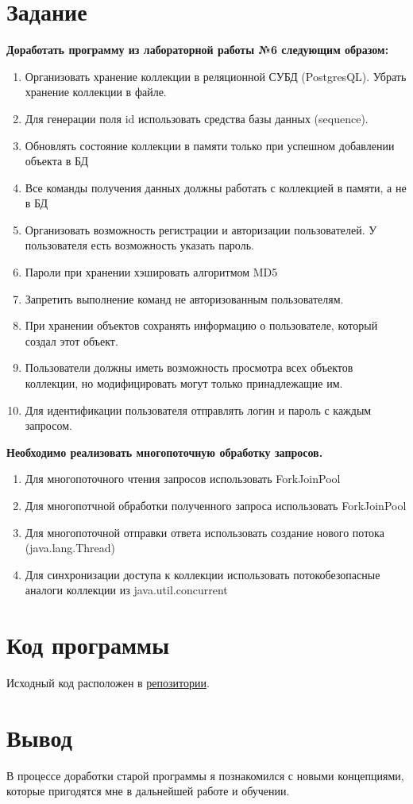 \documentclass[12pt,a4paper]{report}
\begin{document}
\section*{Задание}

\textbf{Доработать программу из лабораторной работы №6 следующим образом:}

\begin{enumerate}
    \item Организовать хранение коллекции в реляционной СУБД (PostgresQL). Убрать хранение коллекции в файле.
    \item Для генерации поля id использовать средства базы данных (sequence).
    \item Обновлять состояние коллекции в памяти только при успешном добавлении объекта в БД
    \item Все команды получения данных должны работать с коллекцией в памяти, а не в БД
    \item Организовать возможность регистрации и авторизации пользователей. У пользователя есть возможность указать пароль.
    \item Пароли при хранении хэшировать алгоритмом MD5
    \item Запретить выполнение команд не авторизованным пользователям.
    \item При хранении объектов сохранять информацию о пользователе, который создал этот объект.
    \item Пользователи должны иметь возможность просмотра всех объектов коллекции, но модифицировать могут только принадлежащие им.
    \item Для идентификации пользователя отправлять логин и пароль с каждым запросом.
\end{enumerate}
\textbf{Необходимо реализовать многопоточную обработку запросов.}
\begin{enumerate}
    \item Для многопоточного чтения запросов использовать ForkJoinPool
    \item Для многопотчной обработки полученного запроса использовать ForkJoinPool
    \item Для многопоточной отправки ответа использовать создание нового потока (java.lang.Thread)
    \item Для синхронизации доступа к коллекции использовать потокобезопасные аналоги коллекции из java.util.concurrent
\end{enumerate}
\section*{Код программы}
Исходный код расположен в \href{https://github.com/Armemius/ItmoStuff/tree/main/programming/lab7}{репозитории}.
\section*{Вывод}
В процессе доработки старой программы я познакомился с новыми концепциями, 
которые пригодятся мне в дальнейшей работе и обучении.
\end{document}
